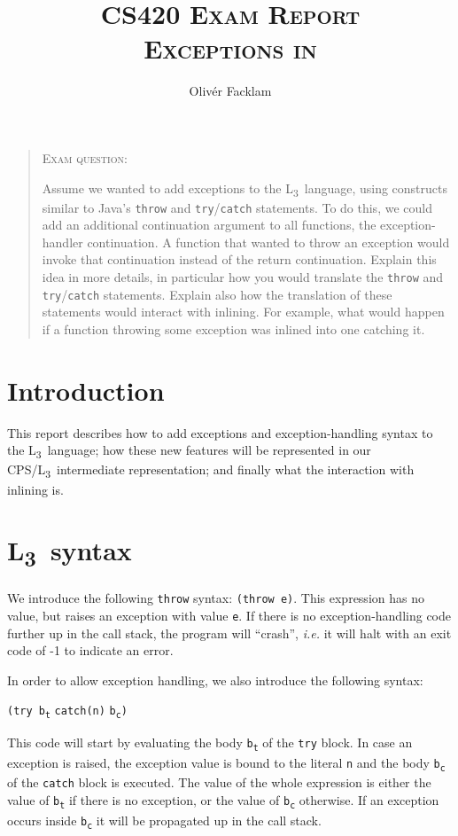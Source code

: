 \documentclass[12pt,a4paper]{article}
\author{Olivér Facklam}
\title{\textsc{CS420 Exam Report\\Exceptions in \lang}}
\newcommand{\lang}{L\textsubscript{3}~}
\newcommand{\cl}[3]{\texttt{\textcolor{OliveGreen}{#1}#2\textcolor{OliveGreen}{#3}}}
\newcommand{\ts}[2]{#1\textsubscript{#2}}
\newcommand{\code}[1]{\texttt{#1}}
\begin{document}
\maketitle

\begin{quote}
\textsc{\large Exam question:}

Assume we wanted to add exceptions to the \lang language, using constructs similar to Java's \texttt{throw} and \texttt{try}/\texttt{catch} statements. To do this, we could add an additional continuation argument to all functions, the exception-handler continuation. A function that wanted to throw an exception would invoke that continuation instead of the return continuation. Explain this idea in more details, in particular how you would translate the \texttt{throw} and \texttt{try}/\texttt{catch} statements. Explain also how the translation of these statements would interact with inlining. For example, what would happen if a function throwing some exception was inlined into one catching it.
\end{quote}


\section*{Introduction}

This report describes how to add exceptions and exception-handling syntax to the \lang language; how these new features will be represented in our CPS/\lang intermediate representation; and finally what the interaction with inlining is.

\section{\lang syntax}

We introduce the following \texttt{throw} syntax: \cl{(throw }{e}{)}. This expression has no value, but raises an exception with value \texttt{e}. If there is no exception-handling code further up in the call stack, the program will ``crash'', \textit{i.e.} it will halt with an exit code of -1 to indicate an error.

In order to allow exception handling, we also introduce the following syntax: 

\begin{center}
\cl{(try }{\ts{b}{t}}{} \cl{catch(}{n}{)} \cl{}{\ts{b}{c}}{)}
\end{center}

This code will start by evaluating the body \code{\ts{b}{t}} of the \code{try} block. In case an exception is raised, the exception value is bound to the literal \code{n} and the body \code{\ts{b}{c}} of the \code{catch} block is executed. The value of the whole expression is either the value of \code{\ts{b}{t}} if there is no exception, or the value of \code{\ts{b}{c}} otherwise. 
If an exception occurs inside \code{\ts{b}{c}} it will be propagated up in the call stack.
\end{document}
